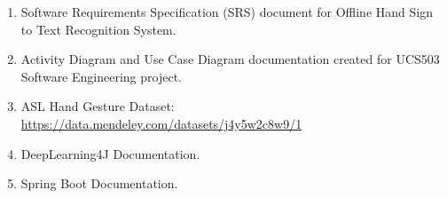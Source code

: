 \documentclass[11pt,a4paper]{report}
\begin{document}
\begin{enumerate}

\item Software Requirements Specification (SRS) document for Offline Hand Sign to Text Recognition System.

\item Activity Diagram and Use Case Diagram documentation created for UCS503 Software Engineering project.

\item ASL Hand Gesture Dataset:
\url{https://data.mendeley.com/datasets/j4y5w2c8w9/1}

\item DeepLearning4J Documentation.

\item Spring Boot Documentation.

\end{enumerate}
\end{document}
